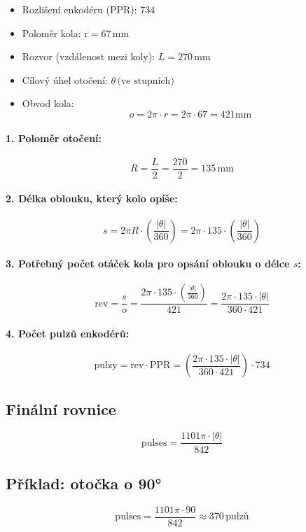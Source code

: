 \begin{itemize}
  \item Rozlišení enkodéru (PPR): \( 734 \)
  \item Poloměr kola:  \( \text{r} = 67 \, \text{mm} \)
  \item Rozvor (vzdálenost mezi koly): \( L = 270 \, \text{mm} \)
  \item Cílový úhel otočení: \( \theta \, \text{(ve stupních)} \)
  \item Obvod kola: 
  \[
  o = 2\pi \cdot r = 2\pi \cdot 67 = 421 \text{mm}
  \]
\end{itemize}


\paragraph{1. Poloměr otočení:}
\[
R = \frac{L}{2} = \frac{270}{2} = 135 \, \text{mm}
\]

\paragraph{2. Délka oblouku, který kolo opíše:}
\[
s = 2\pi R \cdot \left( \frac{|\theta|}{360} \right) = 2\pi \cdot 135 \cdot \left( \frac{|\theta|}{360} \right)
\]

\paragraph{3. Potřebný počet otáček kola pro opsání oblouku o délce \( s \):}
\[
\text{rev} = \frac{s}{o} = \frac{2\pi \cdot 135 \cdot \left( \frac{|\theta|}{360} \right)}{421} = \frac{2\pi \cdot 135 \cdot |\theta|}{360 \cdot 421}
\]

\paragraph{4. Počet pulzů enkodérů:}
\[
\text{pulzy} = \text{rev} \cdot \text{PPR} = \left( \frac{2\pi \cdot 135 \cdot |\theta|}{360 \cdot 421} \right) \cdot 734
\]

\subsection*{Finální rovnice}
\[
\boxed{
\text{pulses} = \frac{1101\pi \cdot |\theta|}{842}
}
\]

\subsection*{Příklad: otočka o 90°}
\[
\text{pulses} = \frac{1101\pi \cdot 90}{842} \approx 370 \, \text{pulzů}
\]





